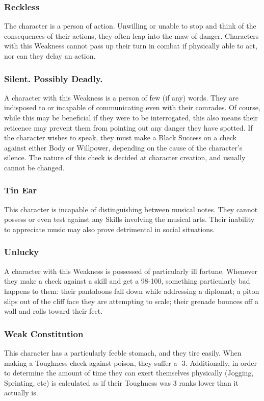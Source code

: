 \documentclass[oneside]{book}
\begin{document}
\begin{multicols}{2}
\subsubsection{Reckless}
The character is a person of action. Unwilling or unable to stop and think of the consequences of their actions, they often leap into the maw of danger. Characters with this Weakness cannot pass up their turn in combat if physically able to act, nor can they delay an action. 

\subsubsection{Silent. Possibly Deadly.}
A character with this Weakness is a person of few (if any) words. They are indisposed to or incapable of communicating even with their comrades. Of course, while this may be beneficial if they were to be interrogated, this also means their reticence may prevent them from pointing out any danger they have spotted. If the character wishes to speak, they must make a Black Success on a check against either Body or Willpower, depending on the cause of the character's silence. The nature of this check is decided at character creation, and usually cannot be changed. 

\subsubsection{Tin Ear}
This character is incapable of distinguishing between musical notes. They cannot possess or even test against any Skills involving the musical arts. Their inability to appreciate music may also prove detrimental in social situations. 

\subsubsection{Unlucky}
A character with this Weakness is possessed of particularly ill fortune. Whenever they make a check against a skill and get a 98-100, something particularly bad happens to them: their pantaloons fall down while addressing a diplomat; a piton slips out of the cliff face they are attempting to scale; their grenade bounces off a wall and rolls toward their feet. 

\subsubsection{Weak Constitution}
This character has a particularly feeble stomach, and they tire easily. When making a Toughness check against poison, they suffer a -3. Additionally, in order to determine the amount of time they can exert themselves physically (Jogging, Sprinting, etc) is calculated as if their Toughness was 3 ranks lower than it actually is.


\end{multicols}
\end{document}
